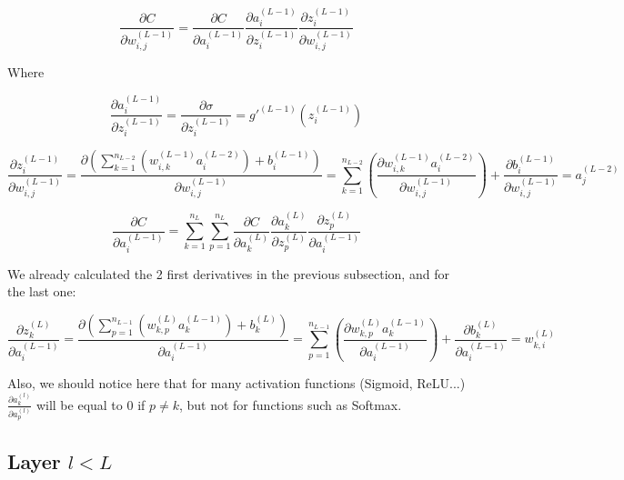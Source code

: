 \documentclass[11pt,a4paper]{report}
\begin{document}
\begin{equation*}
    \frac{\partial C}{\partial w_{i,j}^{(L-1)}} = \frac{\partial C}{\partial a_i^{(L-1)}} \frac{\partial a_i^{(L-1)}}{\partial z_i^{(L-1)}} \frac{\partial z_i^{(L-1)}}{\partial w_{i,j}^{(L-1)}}
\end{equation*}

Where

\begin{equation*}
    \frac{\partial a_i^{(L-1)}}{\partial z_i^{(L-1)}} = \frac{\partial \sigma}{\partial z_i^{(L-1)}} = g'^{(L-1)}(z_i^{(L-1)})
\end{equation*}

\begin{equation*}
    \frac{\partial z_i^{(L-1)}}{\partial w_{i,j}^{(L-1)}} = \frac{\partial \left( \sum\limits_{k=1}^{n_{L-2}} \left(w_{i,k}^{(L-1)} a_i^{(L-2)}\right) + b_i^{(L-1)}\right)}{\partial w_{i,j}^{(L-1)}} = \sum\limits_{k=1}^{n_{L-2}}\left( \frac{\partial w_{i,k}^{(L-1)} a_i^{(L-2)}}{\partial w_{i,j}^{(L-1)}}\right) + \frac{\partial b_i^{(L-1)}}{\partial w_{i,j}^{(L-1)}} = a_j^{(L-2)}
\end{equation*}



\begin{equation*}
    \frac{\partial C}{\partial a_i^{(L-1)}} = \sum\limits_{k=1}^{n_{L}}\sum\limits_{p=1}^{n_{L}}\frac{\partial C}{\partial a_k^{(L)}} \frac{\partial a_k^{(L)}}{\partial z_p^{(L)}} \frac{\partial z_p^{(L)}}{\partial a_i^{(L-1)}}
\end{equation*}

We already calculated the 2 first derivatives in the previous subsection, and for the last one:

\begin{equation*}
    \frac{\partial z_k^{(L)}}{\partial a_i^{(L-1)}} = \frac{\partial \left( \sum\limits_{p=1}^{n_{L-1}} \left(w_{k,p}^{(L)} a_k^{(L-1)}\right) + b_k^{(L)}\right)}{\partial a_i^{(L-1)}} = \sum\limits_{p=1}^{n_{L-1}}\left( \frac{\partial w_{k,p}^{(L)} a_k^{(L-1)}}{\partial a_i^{(L-1)}}\right) + \frac{\partial b_k^{(L)}}{\partial a_i^{(L-1)}} = w_{k,i}^{(L)}
\end{equation*}

Also, we should notice here that for many activation functions (Sigmoid, ReLU...) $\frac{\partial a_k^{(l)}}{\partial a_p^{(l)}}$ will be equal to 0 if $p\neq k$, but not for functions such as Softmax.

\subsection{Layer $l<L$}
\end{document}
